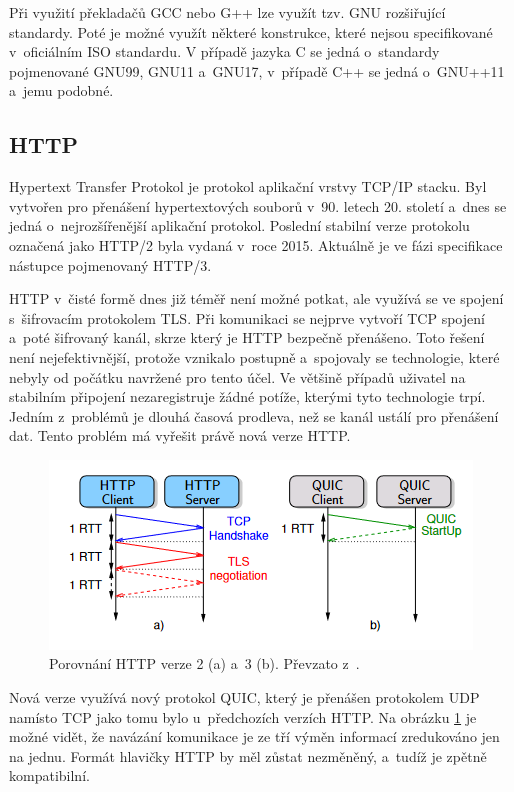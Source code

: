 Při využití překladačů GCC nebo G++ lze využít tzv. GNU rozšiřující standardy. Poté je možné využít některé konstrukce, které nejsou specifikované v oficiálním ISO standardu.
V případě jazyka C se jedná o standardy pojmenované GNU99, GNU11 a GNU17, v případě C++ se jedná o GNU++11 a jemu podobné.

\subsection{HTTP}

Hypertext Transfer Protokol je protokol aplikační vrstvy TCP/IP stacku. Byl vytvořen pro přenášení hypertextových souborů v 90. letech 20. století a dnes se jedná o nejrozšířenější
aplikační protokol. Poslední stabilní verze protokolu označená jako HTTP/2 byla vydaná v roce 2015. Aktuálně je ve fázi specifikace nástupce pojmenovaný HTTP/3.

HTTP v čisté formě dnes již téměř není možné potkat, ale využívá se ve spojení s šifrovacím protokolem TLS. Při komunikaci se nejprve vytvoří TCP spojení a poté šifrovaný kanál,
skrze který je HTTP bezpečně přenášeno. Toto řešení není nejefektivnější, protože vznikalo postupně a spojovaly se technologie, které nebyly od počátku navržené pro tento účel.
Ve většině případů uživatel na stabilním připojení nezaregistruje žádné potíže, kterými tyto technologie trpí. Jedním z problémů je dlouhá časová prodleva, než se kanál ustálí
pro přenášení dat. Tento problém má vyřešit právě nová verze HTTP. \cite{HTTP3}

\begin{figure}[h]
    \centering
    \includegraphics[width=0.8\linewidth]{other-fig/http_comparison.png}
    \caption{Porovnání HTTP verze 2 (a) a 3 (b). Převzato z \cite{HTTP3}.}
    \label{fig:http_comparison}
\end{figure}

Nová verze využívá nový protokol QUIC, který je přenášen protokolem UDP namísto TCP jako tomu bylo u předchozích verzích HTTP. Na obrázku \ref{fig:http_comparison}
je možné vidět, že navázání komunikace je ze tří výměn informací zredukováno jen na jednu. Formát hlavičky HTTP by měl zůstat nezměněný, a tudíž je zpětně kompatibilní.

